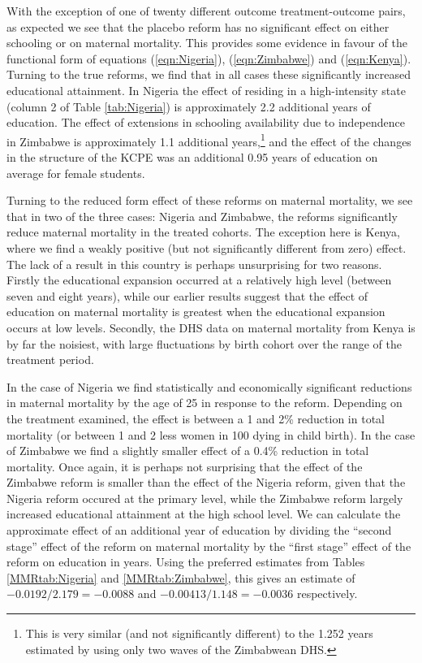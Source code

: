 \documentclass{article}[12pt,subeqn]
\begin{document}
\begin{spacing}{1.4}
With the exception of one of twenty different outcome treatment-outcome pairs, as 
expected we see that the placebo reform has no significant effect on either 
schooling or on maternal mortality.  This provides some evidence in favour of the 
functional form of equations (\ref{eqn:Nigeria}), (\ref{eqn:Zimbabwe}) and 
(\ref{eqn:Kenya}). Turning to the true reforms, we find that in all cases these 
significantly increased educational attainment. In Nigeria the effect of residing 
in a high-intensity state (column 2 of Table \ref{tab:Nigeria}) is approximately 
2.2 additional years of education.  The effect of extensions in schooling 
availability due to independence in Zimbabwe is approximately 1.1 additional 
years,\footnote{This is very similar (and not significantly different) to the 
1.252 years estimated by \citet{AgueroBharawadj2011} using only two waves of the 
Zimbabwean DHS.} and the effect of the changes in the structure of the KCPE was an 
additional 0.95 years of education on average for female students.

Turning to the reduced form effect of these reforms on maternal mortality, we see 
that in two of the three cases: Nigeria and Zimbabwe, the reforms significantly 
reduce maternal mortality in the treated cohorts. The exception here is Kenya,
where we find a weakly positive (but not significantly different from zero) effect.  
The lack of a result in this country is perhaps unsurprising for two reasons.  
Firstly the educational expansion occurred at a relatively high level (between 
seven and eight years), while our earlier results suggest that the effect of 
education on maternal mortality is greatest when the educational expansion occurs 
at low levels.  Secondly, the DHS data on maternal mortality from Kenya is by far 
the noisiest, with large fluctuations by birth cohort over the range of the 
treatment period.

In the case of Nigeria we find statistically and economically significant 
reductions in maternal mortality by the age of 25 in response to the reform.  
Depending on the treatment examined, the effect is between a 1 and 2\% reduction 
in total mortality (or between 1 and 2 less women in 100 dying in child birth).  
In the case of Zimbabwe we find a slightly smaller effect of a 0.4\% reduction in 
total mortality.  Once again, it is perhaps not surprising that the effect of the 
Zimbabwe reform is smaller than the effect of the Nigeria reform, given that the 
Nigeria reform occured at the primary level, while the Zimbabwe reform largely 
increased educational attainment at the high school level.  We can calculate the 
approximate effect of an additional year of education by dividing the 
``second stage'' effect of the reform on maternal mortality by the ``first stage'' 
effect of the reform on education in years.  Using the preferred estimates from 
Tables \ref{MMRtab:Nigeria} and \ref{MMRtab:Zimbabwe}, this gives an estimate of 
$-0.0192/2.179=-0.0088$ and $-0.00413/1.148=-0.0036$ respectively.


\end{spacing}
\end{document}
